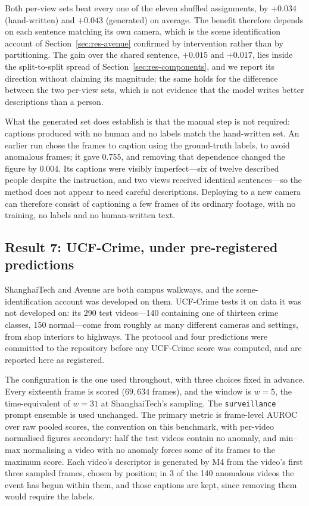 \documentclass[a4paper,fleqn]{cas-sc}
\begin{document}
Both per-view sets beat every one of the eleven shuffled assignments, by
$+0.034$ (hand-written) and $+0.043$ (generated) on average. The benefit
therefore depends on each sentence matching its own camera, which is the scene
identification account of Section~\ref{sec:res-avenue} confirmed by
intervention rather than by partitioning. The gain over the shared sentence,
$+0.015$ and $+0.017$, lies inside the split-to-split spread of
Section~\ref{sec:res-components}, and we report its direction without claiming
its magnitude; the same holds for the difference between the two per-view sets,
which is not evidence that the model writes better descriptions than a person.

What the generated set does establish is that the manual step is not required:
captions produced with no human and no labels match the hand-written set. An
earlier run chose the frames to caption using the ground-truth labels, to avoid
anomalous frames; it gave $0.755$, and removing that dependence changed the
figure by $0.004$. Its captions were visibly imperfect---six of twelve described
people despite the instruction, and two views received identical sentences---so
the method does not appear to need careful descriptions. Deploying to a new camera can therefore consist of
captioning a few frames of its ordinary footage, with no training, no labels and
no human-written text.

\subsection{Result 7: UCF-Crime, under pre-registered predictions}
\label{sec:res-ucf}
ShanghaiTech and Avenue are both campus walkways, and the scene-identification
account was developed on them. UCF-Crime \citep{sultani2018ucfcrime} tests it on
data it was not developed on: its 290 test videos---140 containing one of
thirteen crime classes, 150 normal---come from roughly as many different cameras
and settings, from shop interiors to highways. The protocol and four predictions
were committed to the repository before any UCF-Crime score was computed, and are
reported here as registered.

The configuration is the one used throughout, with three choices fixed in
advance. Every sixteenth frame is scored ($69{,}634$ frames), and the window is
$w{=}5$, the time-equivalent of $w{=}31$ at ShanghaiTech's sampling. The
\texttt{surveillance} prompt ensemble is used unchanged. The primary metric is
frame-level AUROC over raw pooled scores, the convention on this benchmark, with
per-video normalised figures secondary: half the test videos contain no anomaly,
and min--max normalising a video with no anomaly forces some of its frames to the
maximum score. Each video's descriptor is generated by M4 from the video's first
three sampled frames, chosen by position; in 3 of the 140 anomalous videos the
event has begun within them, and those captions are kept, since removing them
would require the labels.
\end{document}
